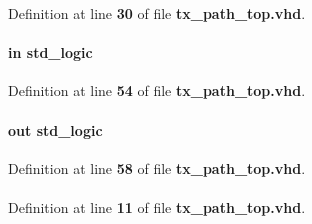 Definition at line {\bf 30} of file {\bf tx\+\_\+path\+\_\+top.\+vhd}.

\paragraph[{fidm}]{ {\bfseries \textcolor{keywordflow}{in}\textcolor{vhdlchar}{ }} {\bfseries \textcolor{comment}{std\+\_\+logic}\textcolor{vhdlchar}{ }} \hspace{0.3cm}{\ttfamily [Port]}}\label{classtx__path__top_a97ae5ad9eee26d5f984f95d151f62ec0}


Definition at line {\bf 54} of file {\bf tx\+\_\+path\+\_\+top.\+vhd}.

\paragraph[{fsync}]{ {\bfseries \textcolor{keywordflow}{out}\textcolor{vhdlchar}{ }} {\bfseries \textcolor{comment}{std\+\_\+logic}\textcolor{vhdlchar}{ }} \hspace{0.3cm}{\ttfamily [Port]}}\label{classtx__path__top_a2b82fb2251ed5f44aaa2daf192b34e42}


Definition at line {\bf 58} of file {\bf tx\+\_\+path\+\_\+top.\+vhd}.

\paragraph[{general\+\_\+pkg}]{\hspace{0.3cm}{\ttfamily [Package]}}\label{classtx__path__top_ad215d9eaebfb6f0dce80b7247f44b24c}


Definition at line {\bf 11} of file {\bf tx\+\_\+path\+\_\+top.\+vhd}.

\paragraph[{ieee}]{\hspace{0.3cm}{\ttfamily [Library]}}\label{classtx__path__top_a0a6af6eef40212dbaf130d57ce711256}


